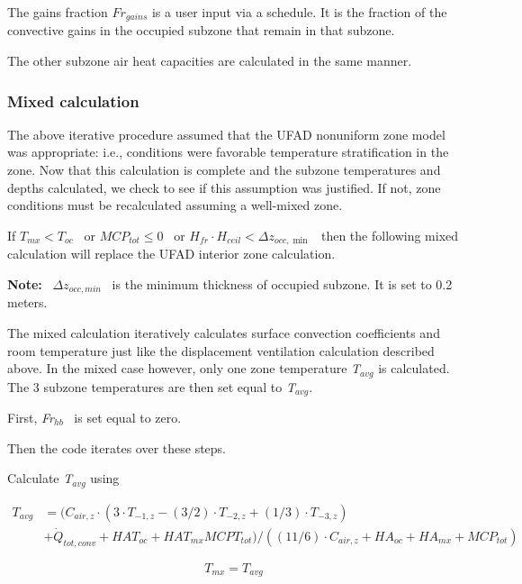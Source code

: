 The gains fraction \(F{r_{gains}}\) is a user input via a schedule. It is the fraction of the convective gains in the occupied subzone that remain in that subzone.

The other subzone air heat capacities are calculated in the same manner.

\subsubsection{Mixed calculation}\label{mixed-calculation-1}

The above iterative procedure assumed that the UFAD nonuniform zone model was appropriate: i.e., conditions were favorable temperature stratification in the zone. Now that this calculation is complete and the subzone temperatures and depths calculated, we check to see if this assumption was justified. If not, zone conditions must be recalculated assuming a well-mixed zone.

If \({T_{mx}} < {T_{oc}}\) ~or \(MC{P_{tot}} \le 0\) ~or \({H_{fr}} \cdot {H_{ceil}} < \Delta {z_{occ,\min }}\) ~then the following mixed calculation will replace the UFAD interior zone calculation.

\textbf{Note:} ~\(\Delta {z_{occ,min}}\) ~is the minimum thickness of occupied subzone. It is set to 0.2 meters.

The mixed calculation iteratively calculates surface convection coefficients and room temperature just like the displacement ventilation calculation described above. In the mixed case however, only one zone temperature \emph{T\(_{avg}\)} is calculated. The 3 subzone temperatures are then set equal to \emph{T\(_{avg}\)}.

First, \emph{Fr\(_{hb}\)}~ is set equal to zero.

Then the code iterates over these steps.

Calculate \emph{T\(_{avg}\)} using

\begin{equation}
  \begin{array}{rl}
    T_{avg} &= ({C_{air,z}} \cdot (3 \cdot {T_{ - 1,z}} - (3/2) \cdot {T_{ - 2,z}} + (1/3) \cdot {T_{ - 3,z}}) \\
            &+ {{\dot Q}_{tot,conv}} + HA{T_{oc}} + HA{T_{mx}}MCP{T_{tot}})/((11/6) \cdot {C_{air,z}} + H{A_{oc}} + H{A_{mx}} + MC{P_{tot}})
  \end{array}
\end{equation}

\begin{equation}
{T_{mx}} = {T_{avg}}
\end{equation}

